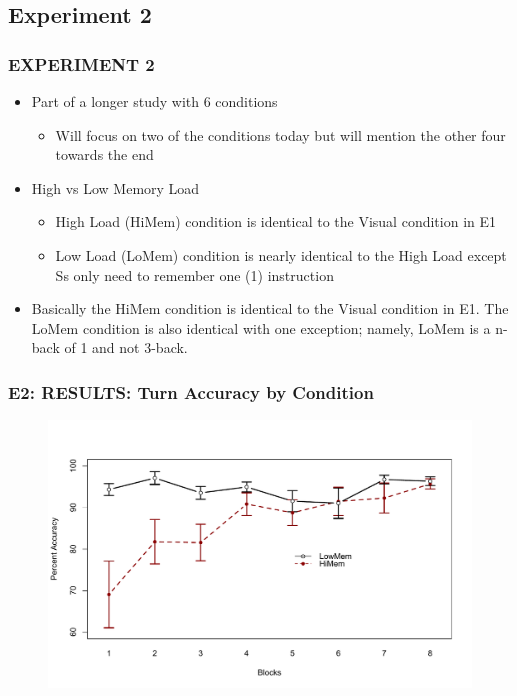 \documentclass{beamer}
\begin{document}
\subsection{Experiment 2}


\begin{frame} 
	\frametitle{EXPERIMENT 2}
	\begin{itemize}
		\item Part of a longer study with 6 conditions
		\begin{itemize}
			\item Will focus on two of the conditions today but will mention the other four towards the end
		\end{itemize}
		\item High vs Low Memory Load 
		\begin{itemize}
			\item High Load (HiMem) condition is identical to the Visual condition in E1
			\item Low Load (LoMem) condition is nearly identical to the High Load except Ss only need to remember one (1) instruction 
		\end{itemize}
		\item Basically the HiMem condition is identical to the Visual condition in E1. The LoMem condition is also identical with one exception; namely, LoMem is a \alert{n-back} of \alert{1} and not 3-back.
  	\end{itemize}
\end{frame}

\begin{frame}
	\frametitle{E2: RESULTS: Turn Accuracy by Condition}
	\vspace{-1.25cm}
	\begin{figure}
		\centering
		\includegraphics[width=.9\textwidth]{../zNvBkFigs/Rplot-E2Acc-LineChrt}
	\end{figure}
\end{frame}
\end{document}

